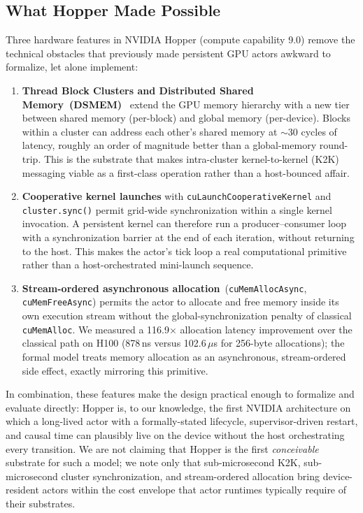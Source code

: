 \subsection{What Hopper Made Possible}

Three hardware features in NVIDIA Hopper (compute capability 9.0)
remove the technical obstacles that previously made persistent
GPU actors awkward to formalize, let alone implement:

\begin{enumerate}
\item \textbf{Thread Block Clusters and Distributed Shared
Memory~(DSMEM)}~\citep{nvidia2022hopper} extend the GPU memory
hierarchy with a new tier between shared memory (per-block) and
global memory (per-device).  Blocks within a cluster can address
each other's shared memory at \(\sim\)30 cycles of latency,
roughly an order of magnitude better than a global-memory
round-trip.  This is the substrate that makes intra-cluster
kernel-to-kernel (K2K) messaging viable as a first-class operation
rather than a host-bounced affair.

\item \textbf{Cooperative kernel launches} with
\texttt{cuLaunchCooperativeKernel} and \texttt{cluster.sync()}
permit grid-wide synchronization within a single kernel invocation.
A persistent kernel can therefore run a producer–consumer loop with
a synchronization barrier at the end of each iteration, without
returning to the host.  This makes the actor's tick loop a real
computational primitive rather than a host-orchestrated
mini-launch sequence.

\item \textbf{Stream-ordered asynchronous
allocation}~(\texttt{cuMemAllocAsync}, \texttt{cuMemFreeAsync})
permits the actor to allocate and free memory inside its own
execution stream without the global-synchronization penalty of
classical \texttt{cuMemAlloc}.  We measured a 116.9\(\times\)
allocation latency improvement over the classical path on H100
(878\,ns versus 102.6\,\(\mu\)s for 256-byte allocations); the
formal model treats memory allocation as an asynchronous,
stream-ordered side effect, exactly mirroring this primitive.
\end{enumerate}

In combination, these features make the design practical enough to
formalize and evaluate directly: Hopper is, to our knowledge, the
first NVIDIA architecture on which a long-lived actor with a
formally-stated lifecycle, supervisor-driven restart, and causal
time can plausibly live on the device without the host orchestrating
every transition.  We are not claiming that Hopper is the first
\emph{conceivable} substrate for such a model; we note only that
sub-microsecond K2K, sub-microsecond cluster synchronization, and
stream-ordered allocation bring device-resident actors within the
cost envelope that actor runtimes typically require of their
substrates.

